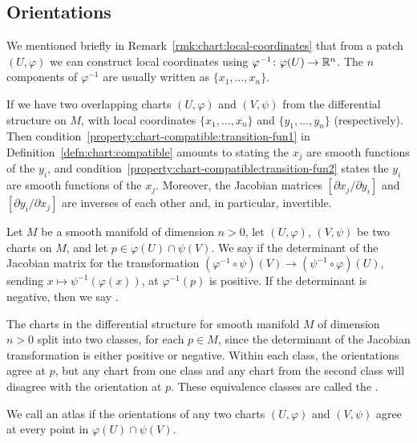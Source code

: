 \subsection{Orientations}

We mentioned briefly in Remark~\ref{rmk:chart:local-coordinates}
that from a patch $(U,\varphi)$ we can construct local coordinates using
$\varphi^{-1}\colon\varphi(U)\to\mathbb{R}^{n}$.
The $n$ components of $\varphi^{-1}$ are usually written as
$\{x_{1},\dots,x_{n}\}$.

If we have two overlapping charts $(U,\varphi)$ and $(V,\psi)$ from the
differential structure on $M$, with local coordinates $\{x_{1},\dots,x_{n}\}$
and $\{y_{1},\dots,y_{n}\}$ (respectively). Then
condition~\ref{property:chart-compatible:transition-fun1} in
Definition~\ref{defn:chart:compatible} amounts to stating
the $x_{j}$ are smooth functions of the $y_{i}$, and
condition~\ref{property:chart-compatible:transition-fun2} states
the $y_{i}$ are smooth functions of the $x_{j}$.
Moreover, the Jacobian matrices $[\partial x_{j}/\partial y_{i}]$
and $[\partial y_{i}/\partial x_{j}]$ are inverses of each other and, in
particular, invertible.

\begin{definition}
Let $M$ be a smooth manifold of dimension $n>0$,
let $(U,\varphi)$, $(V,\psi)$ be two charts on $M$,
and let $p\in\varphi(U)\cap\psi(V)$.
We say  if
the determinant of the Jacobian matrix for the transformation
$(\varphi^{-1}\circ\psi)(V)\to(\psi^{-1}\circ\varphi)(U)$,
sending $x\mapsto\psi^{-1}(\varphi(x))$, at $\varphi^{-1}(p)$ is positive.
If the determinant is negative, then we say
.
\end{definition}

\begin{definition}
The charts in the differential structure for smooth manifold $M$ of
dimension $n>0$ split into two classes, for each $p\in M$, since the
determinant of the Jacobian transformation is either positive or negative.
Within each class, the orientations agree at $p$, but any chart from one
class and any chart from the second class will disagree with the orientation
at $p$. These equivalence classes are called the .
\end{definition}

\begin{definition}
We call an atlas  if the orientations of any two charts
$(U,\varphi)$ and $(V,\psi)$ agree at every point in $\varphi(U)\cap\psi(V)$.
\end{definition}

